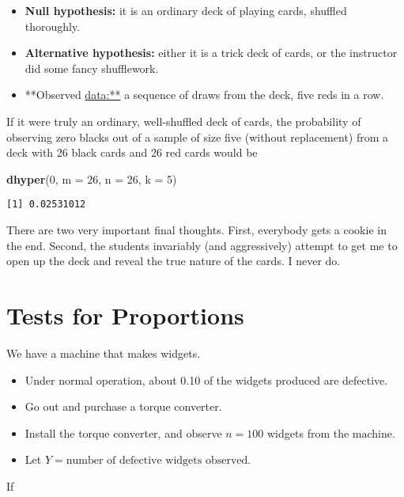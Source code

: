 \documentclass[]{book}
\newenvironment{Shaded}{\begin{snugshade}}{\end{snugshade}}
\newcommand{\KeywordTok}[1]{\textcolor[rgb]{0.13,0.29,0.53}{\textbf{{#1}}}}
\newcommand{\DataTypeTok}[1]{\textcolor[rgb]{0.13,0.29,0.53}{{#1}}}
\newcommand{\DecValTok}[1]{\textcolor[rgb]{0.00,0.00,0.81}{{#1}}}
\newcommand{\NormalTok}[1]{{#1}}
\providecommand{\tightlist}{%
  \setlength{\itemsep}{0pt}\setlength{\parskip}{0pt}}
\numberwithin{equation}{chapter}
\numberwithin{figure}{chapter}
\theoremstyle{plain}
\theoremstyle{definition}
\theoremstyle{remark}
\theoremstyle{definition}
\theoremstyle{definition}
\theoremstyle{remark}
\let\BeginKnitrBlock\begin \let\EndKnitrBlock\end
\begin{document}
\begin{itemize}
\tightlist
\item
  \textbf{Null hypothesis:} it is an ordinary deck of playing cards,
  shuffled thoroughly.
\item
  \textbf{Alternative hypothesis:} either it is a trick deck of cards,
  or the instructor did some fancy shufflework.
\item
  **Observed \url{data:**} a sequence of draws from the deck, five reds
  in a row.
\end{itemize}

If it were truly an ordinary, well-shuffled deck of cards, the
probability of observing zero blacks out of a sample of size five
(without replacement) from a deck with 26 black cards and 26 red cards
would be

\begin{Shaded}
\begin{Highlighting}[]
\KeywordTok{dhyper}\NormalTok{(}\DecValTok{0}\NormalTok{, }\DataTypeTok{m =} \DecValTok{26}\NormalTok{, }\DataTypeTok{n =} \DecValTok{26}\NormalTok{, }\DataTypeTok{k =} \DecValTok{5}\NormalTok{)}
\end{Highlighting}
\end{Shaded}

\begin{verbatim}
[1] 0.02531012
\end{verbatim}

There are two very important final thoughts. First, everybody gets a
cookie in the end. Second, the students invariably (and aggressively)
attempt to get me to open up the deck and reveal the true nature of the
cards. I never do.

\section{Tests for Proportions}\label{sec-tests-for-proportions}

\BeginKnitrBlock{example}
\protect\hypertarget{ex:widget-machine}{}{\label{ex:widget-machine}}We have
a machine that makes widgets.

\begin{itemize}
\tightlist
\item
  Under normal operation, about 0.10 of the widgets produced are
  defective.
\item
  Go out and purchase a torque converter.
\item
  Install the torque converter, and observe \(n=100\) widgets from the
  machine.
\item
  Let \(Y=\mbox{number of defective widgets observed}\).
\end{itemize}
\EndKnitrBlock{example} If
\end{document}
